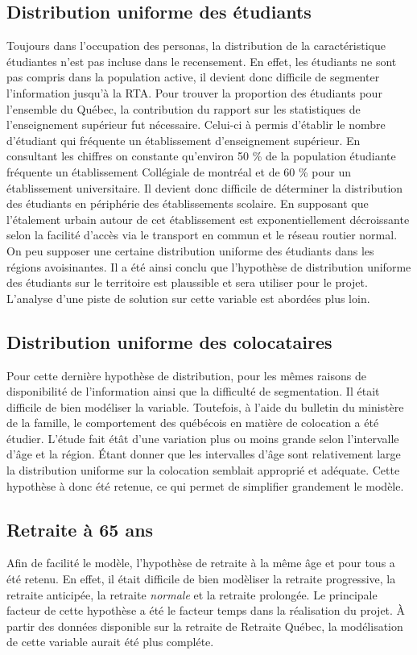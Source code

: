 \documentclass[11pt,french]{report}\usepackage[]{graphicx}\usepackage[]{color}
\begin{document}
\subsection*{Distribution uniforme des étudiants}
Toujours dans l'occupation des personas, la distribution de la caractéristique étudiantes n'est pas incluse dans le recensement. En effet, les étudiants ne sont pas compris dans la population active, il devient donc difficile de segmenter l'information jusqu'à la RTA. Pour trouver la proportion des étudiants pour l'ensemble du Québec, la contribution du rapport sur les statistiques de l'enseignement supérieur fut nécessaire. Celui-ci à permis d'établir le nombre d'étudiant qui fréquente un établissement d'enseignement supérieur. En consultant les chiffres on constante qu'environ 50 \% de la population étudiante fréquente un établissement Collégiale de montréal et de 60 \% pour un établissement universitaire. Il devient donc difficile de déterminer la distribution des étudiants en périphérie des établissements scolaire. En supposant que l'étalement urbain autour de cet établissement est exponentiellement décroissante selon la facilité d'accès via le transport en commun et le réseau routier normal. On peu supposer une certaine distribution uniforme des étudiants dans les régions avoisinantes. Il a été ainsi conclu que l'hypothèse de distribution uniforme des étudiants sur le territoire est plaussible et sera utiliser pour le projet. L'analyse d'une piste de solution sur cette variable est abordées plus loin.

\subsection*{Distribution uniforme des colocataires}
Pour cette dernière hypothèse de distribution, pour les mêmes raisons de disponibilité de l'information ainsi que la difficulté de segmentation. Il était difficile de bien modéliser la variable. Toutefois, à l'aide du bulletin du ministère de la famille, le comportement des québécois en matière de colocation a été étudier. L'étude fait étât d'une variation plus ou moins grande selon l'intervalle d'âge et la région. Étant donner que les intervalles d'âge sont relativement large la distribution uniforme sur la colocation semblait approprié et adéquate. Cette hypothèse à donc été retenue, ce qui permet de simplifier grandement le modèle. 

\subsection*{Retraite à 65 ans}
Afin de facilité le modèle, l'hypothèse de retraite à la même âge et pour tous a été retenu. En effet, il était difficile de bien modèliser la retraite progressive, la retraite anticipée, la retraite \emph{normale} et la retraite prolongée. Le principale facteur de cette hypothèse a été le facteur temps dans la réalisation du projet. À partir des données disponible sur la retraite de Retraite Québec, la modélisation de cette variable aurait été plus compléte.
\newline
\end{document}
